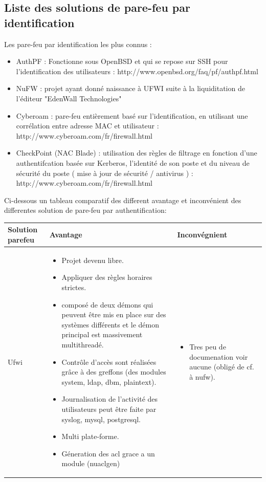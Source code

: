 \documentclass[12pt]{report}
\begin{document}
\begin{itemize}
\chapter{Liste des solutions de pare-feu par identification}
Les pare-feu par identification les plus connus : 
  \begin{itemize}
    \item AuthPF : Fonctionne sous OpenBSD et qui se repose sur SSH pour l'identification des utilisateurs : http://www.openbsd.org/faq/pf/authpf.html
    \item NuFW : projet ayant donné naissance à UFWI suite à la liquiditation de l'éditeur "EdenWall Technologies"
    \item Cyberoam : pare-feu entièrement basé sur l'identification, en utilisant une corrélation entre adresse MAC et utilisateur : http://www.cyberoam.com/fr/firewall.html
    \item CheckPoint (NAC Blade) : utilisation des règles de filtrage en fonction d'une authentifcation basée sur Kerberos, l'identité de son poste et du niveau de sécurité du poste ( mise à jour de sécurité / antivirus ) : http://www.cyberoam.com/fr/firewall.html
  \end{itemize}
\newligne
Ci-dessous un tableau comparatif des different avantage et inconvénient des differentes solution de pare-feu par authentification: \\
\begin{tabular}{|p{3cm}|p{5cm}|p{5cm}|}
  \hline
  Solution parefeu & Avantage & Inconvégnient\\
  \hline
	Ufwi &
 	\begin{itemize}
		\item Projet devenu libre.
		\item Appliquer des règles horaires strictes.
		\item  composé de deux démons qui peuvent être mis en place sur des systèmes différents et le démon principal est massivement multithreadé.
		\item Contrôle d’accès sont réalisées grâce à des greffons (des modules system, ldap, dbm, plaintext).
		\item Journalisation de l’activité des utilisateurs peut être faite par syslog, mysql, postgresql.
		\item Multi plate-forme.
		\item Géneration des acl grace a un module (nuaclgen)
	\end{itemize}&
	\begin{itemize}
		\item Tres peu de documenation voir aucune (obligé de cf. à nufw).

\end{itemize}
\end{tabular}
\end{itemize}
\end{document}
